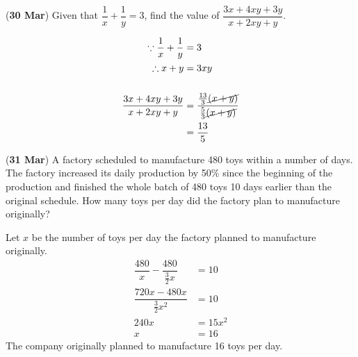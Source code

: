 \documentclass[12pt, answers]{exam}
\begin{document}
\begin{questions}
	\question (\textbf{30 Mar}) Given that \(\dfrac{1}{x} + \dfrac{1}{y} = 3\),
	find the value of \(\dfrac{3x + 4xy + 3y}{x + 2xy + y}\).
	\begin{solution}
		\begin{align*}
			\because \dfrac{1}{x} + \dfrac{1}{y} & = 3                                                             \\
			\therefore x + y                     & = 3xy                                                           \\
			\\
			\dfrac{3x+4xy+3y}{x+2xy+y}           & = \dfrac{\frac{13}{3}\cancel{(x+y)}}{\frac{5}{3}\cancel{(x+y)}} \\
			                                     & = \dfrac{13}{5}                                                 \\
		\end{align*}
	\end{solution}

	\question (\textbf{31 Mar})
	A factory scheduled to manufacture 480 toys within a number of days.
	The factory increased its daily production by 50\% since the beginning
	of the production and finished the whole batch of 480 toys 10 days earlier
	than the original schedule. How many toys per day did the factory plan
	to manufacture originally?

	\begin{solution}
		Let \(x\) be the number of toys per day the factory planned to manufacture originally.
		\begin{align*}
			\dfrac{480}{x} - \dfrac{480}{\frac{3}{2}x} & = 10    \\
			\dfrac{720x - 480x}{\frac{3}{2}x^2}        & = 10    \\
			240x                                       & = 15x^2 \\
			x                                          & = 16
		\end{align*}
		The company originally planned to manufacture 16 toys per day.
	\end{solution}
\end{questions}
\end{document}
